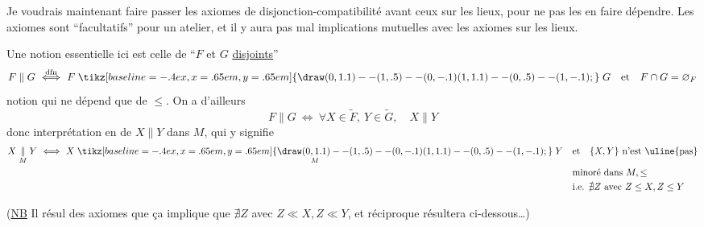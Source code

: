 Je voudrais maintenant faire passer les axiomes de disjonction-compatibilité avant ceux sur les lieux, pour ne pas  les en faire dépendre. Les axiomes sont ``facultatifs'' pour un atelier, et il y aura pas mal  implications mutuelles avec les axiomes sur les lieux.

Une notion essentielle ici est celle de ``$F$ et $G$ \uline{disjoints}''
\[
 F\parallel G\ \overset{\mathrm{dfn}}{\Longleftrightarrow}\ F\mathrel{\tikz[baseline=-.4ex,x=.65em,y=.65em]{\draw (0,1.1)--(1,.5)--(0,-.1) (1,1.1)--(0,.5)--(1,-.1);}}G\quad\text{et}\quad F\cap G=\varnothing_F
\]
notion qui ne dépend que de $\leq$. On a d'ailleurs
\[
 F\parallel G\ \Longleftrightarrow\ \forall X\in\widetilde F,\ Y\in\widetilde G,\quad X\parallel Y
\]
donc interprétation en  de $X\parallel Y$ dans $M$, qui y signifie
\[
\begin{aligned}
X\mathrel{\underset{M}{\parallel}}Y\ \Longleftrightarrow\
 X\mathrel{\underset{M}{\mathrel{\tikz[baseline=-.4ex,x=.65em,y=.65em]{\draw (0,1.1)--(1,.5)--(0,-.1) (1,1.1)--(0,.5)--(1,-.1);}}}}Y\quad &\text{et}\quad\{X,Y\}\ \text{n'est \uline{pas}}\\
&\text{minoré dans } M,\leq\\
&\text{i.e. }\nexists Z\ \text{avec }Z\leq X,Z\leq Y
\end{aligned}
\]

(\uline{NB} Il résul\deleted{\illegible{1}}\unsure{te|tera} des axiomes  que ça implique que $\nexists Z$ avec $Z\ll X,Z\ll Y$,  et  réciproque résultera  ci-dessous\ldots)

